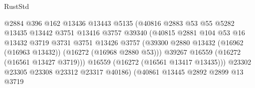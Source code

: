 \begin{lexlean}{RustStd}
\begin{coremodule}
                                          @2884
                                          @396
                                          @162
                                          @13436
                                          @13443
                                          @5135
                                          (@40816
                                            @2883
                                            @53
                                            @55
                                            @5282
                                            @13435
                                            @13442
                                            @3751
                                            @13416
                                            @3757
                                            @39340
                                            (@40815
                                              @2881
                                              @104
                                              @53
                                              @16
                                              @13432
                                              @3719
                                              @3731
                                              @3751
                                              @13426
                                              @3757
                                              (@39300
                                                @2880
                                                @13432
                                                (@16962 (@16963 @13432))
                                                (@16272 (@16968 @2880 @53)))
                                              @39267
                                              @16559
                                              (@16272 (@16561 @13427 @3719)))
                                            @16559
                                            (@16272 (@16561 @13417 @13435)))
                                          @23302
                                          @23305
                                          @23308
                                          @23312
                                          @23317
                                          @40186)
                                        (@40861
                                          @13445
                                          @2892
                                          @2899
                                          @13
                                          @3719

\end{coremodule}
\end{lexlean}
